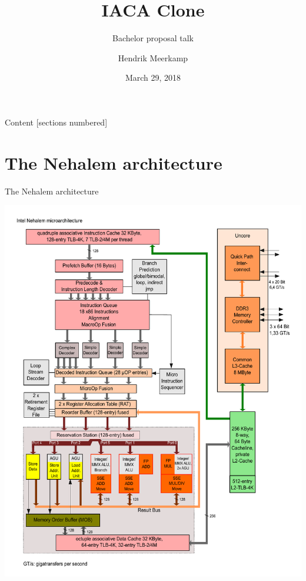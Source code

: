 \documentclass[10pt, tikz,border=2mm, xcolor=dvipsnames]{beamer}
\title{IACA Clone}
\subtitle{Bachelor proposal talk}
\date{March 29, 2018}
\author{Hendrik Meerkamp}
\institute{}
\begin{document}
\maketitle

\begin{frame}{Content}
  [sections numbered]
  \tableofcontents[hideallsubsections]
\end{frame}

\section{The Nehalem architecture}

\begin{frame}{The Nehalem architecture}
\begin{center}
\includegraphics[clip, scale=.26, trim=0 0 0 1.7cm]{Intel_Nehalem_arch}
\end{center}
\end{frame}
\end{document}

